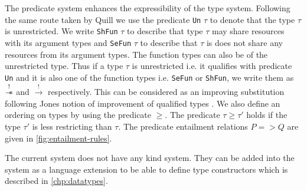 The predicate system enhances the expressibility of the type system. Following the same route taken
by Quill \citep{morris_best_2016} we use the predicate \texttt{Un} $\tau$ to denote
that the type $\tau$ is unrestricted. We write \texttt{ShFun} $\tau$ to describe that type $\tau$ may share resources with its
argument types and \texttt{SeFun} $\tau$ to describe that $\tau$ is
does not share any resources from its argument types. The function types can also be of the unrestricted type.
Thus if a type $\tau$ is unrestricted i.e. it qualifies with predicate \texttt{Un} and it is also one of the function types
i.e. \texttt{SeFun} or \texttt{ShFun}, we write them as $\overset{!}{\mathrel{-\mkern-6mu*}}$ and $\xrightarrow{!}$ respectively.
This can be considered as an improving substitution following Jones notion of improvement of qualified types \citep{jones_simplifying_1995}.
We also define an ordering on types by using the predicate $\geq$. The predicate $\tau \geq \tau'$ holds if the type $\tau'$
is less restricting than $\tau$. The predicate entailment relations $P => Q$ are given in \cref{fig:entailment-rules}.

The current system does not have any kind system. They can be added into the system as a language extension
to be able to define type constructors which is described in \cref{chp:datatypes}.

